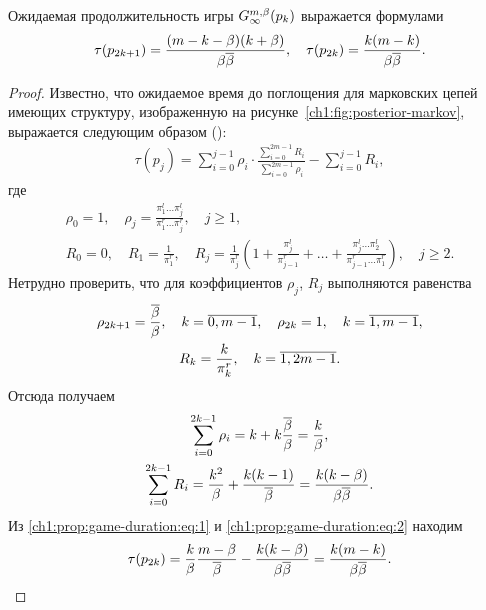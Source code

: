 {\begin{proposition}
  \label{ch1:prop:game-duration}
  Ожидаемая продолжительность игры $\theG*{\infty}(p_k)$ выражается формулами
  \begin{equation*} 
    \tau(p_{2k+1}) = \frac{(m-k-\beta)(k+\beta)}{\beta {{\overline{\beta}}}},\quad
    \tau(p_{2k}) = \frac{k(m-k)}{\beta {{\overline{\beta}}}}.
  \end{equation*}
\end{proposition}
\begin{proof}
  Известно, что ожидаемое время до поглощения для марковских цепей имеющих структуру, изображенную на рисунке~\ref{ch1:fig:posterior-markov}, выражается следующим образом (\seename \cite[\S~12]{shiryaev11}):
  \begin{gather}
    \label{ch1:prop:game-duration:eq:1}
    \tau(p_j) =
    \sum_{i=0}^{j-1} \rho_i \cdot
    \frac{\sum_{i=0}^{2m-1} R_i}{\sum_{i=0}^{2m-1} \rho_i} -
    \sum_{i=0}^{j-1} R_i,
  \end{gather}
  где
  \begin{gather*}
  \rho_0 = 1, \quad
    \rho_j = \frac{\pi^l_1 \ldots \pi^l_j}{\pi^r_1 \ldots \pi^r_j}, \quad j \geq 1,\\
    R_0 = 0, \quad
    R_1 = \frac{1}{\pi^r_1}, \quad
    R_j = \frac{1}{\pi^r_j}\left( 
      1 + 
      \frac{\pi^l_j}{\pi^r_{j-1}} + 
      \ldots + \frac{\pi^l_j \ldots \pi^l_2}{\pi^r_{j-1} \ldots \pi^r_1}
    \right), \quad j \geq 2.
  \end{gather*}
  Нетрудно проверить, что для коэффициентов $\rho_j$, $R_j$ выполняются равенства
  \begin{gather*}
    \rho_{2k+1} = \frac{{{\overline{\beta}}}}{\beta},\quad k = \overline{0, m-1},\quad
    \rho_{2k} = 1,\quad k = \overline{1, m-1},\\
    R_k = \frac{k}{\pi^r_k},\quad k = \overline{1, 2m-1}.
  \end{gather*}
  Отсюда получаем
  \begin{equation}
    \label{ch1:prop:game-duration:eq:2}
    \begin{gathered}
      \sum_{i=0}^{2k-1} \rho_i = k + k \frac{{{\overline{\beta}}}}{\beta} = \frac{k}{\beta},\\
      \sum_{i=0}^{2k-1} R_i = \frac{k^2}{\beta} + \frac{k(k-1)}{{{\overline{\beta}}}} = \frac{k(k-\beta)}{\beta{{\overline{\beta}}}}.
    \end{gathered}
  \end{equation}
  Из \eqref{ch1:prop:game-duration:eq:1} и \eqref{ch1:prop:game-duration:eq:2} находим
  \begin{gather}
    \label{ch1:prop:game-duration:eq3}
    \tau(p_{2k}) =
    \frac{k}{\beta} \frac{m-\beta}{{{\overline{\beta}}}} - \frac{k(k-\beta)}{\beta{{\overline{\beta}}}} =
    \frac{k(m-k)}{\beta{{\overline{\beta}}}}.
  \end{gather}


\end{proof}}
